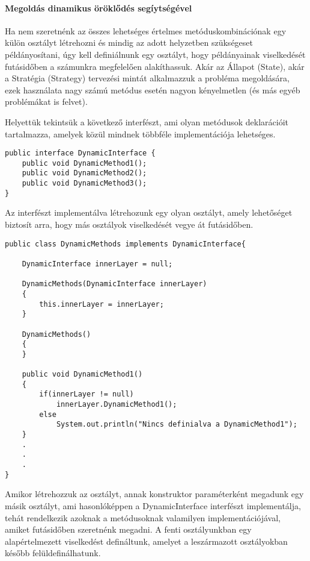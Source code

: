 \paragraph{Megoldás dinamikus öröklődés segíytségével}

Ha nem szeretnénk az összes lehetséges értelmes metóduskombinációnak egy külön osztályt létrehozni és mindig az
adott helyzetben szükségeset példányosítani, úgy kell definiálnunk egy osztályt, hogy példányainak viselkedését futásidőben
a számunkra megfelelően alakíthassuk. Akár az Állapot (State), akár a Stratégia (Strategy) tervezési mintát alkalmazzuk
a probléma megoldására, ezek használata nagy számú metódus esetén nagyon kényelmetlen (és más egyéb problémákat is felvet). 


Helyettük tekintsük a következő interfészt, ami olyan metódusok deklarációit tartalmazza, amelyek közül mindnek többféle
implementációja lehetséges.

\begin{lstlisting}
public interface DynamicInterface {
	public void DynamicMethod1();
	public void DynamicMethod2();
	public void DynamicMethod3();
}
\end{lstlisting}

Az interfészt implementálva létrehozunk egy olyan osztályt, amely lehetőséget biztosít arra, hogy más osztályok
viselkedését vegye át futásidőben.

\begin{lstlisting}
public class DynamicMethods implements DynamicInterface{
	
	DynamicInterface innerLayer = null;
	
	DynamicMethods(DynamicInterface innerLayer)
	{
		this.innerLayer = innerLayer;
	}
	
	DynamicMethods()
	{
	}

	public void DynamicMethod1()
	{
		if(innerLayer != null)
			innerLayer.DynamicMethod1();
		else
			System.out.println("Nincs definialva a DynamicMethod1");
	}
	.
	.
	.
}	
\end{lstlisting}

Amikor létrehozzuk az osztályt, annak konstruktor paraméterként megadunk egy másik osztályt, ami
hasonlóképpen a DynamicInterface interfészt implementálja, tehát rendelkezik azoknak a metódusoknak
valamilyen implementációjával, amiket futásidőben szeretnénk megadni. A fenti osztályunkban
egy alapértelmezett viselkedést defináltunk, amelyet a leszármazott osztályokban később felüldefinálhatunk.

